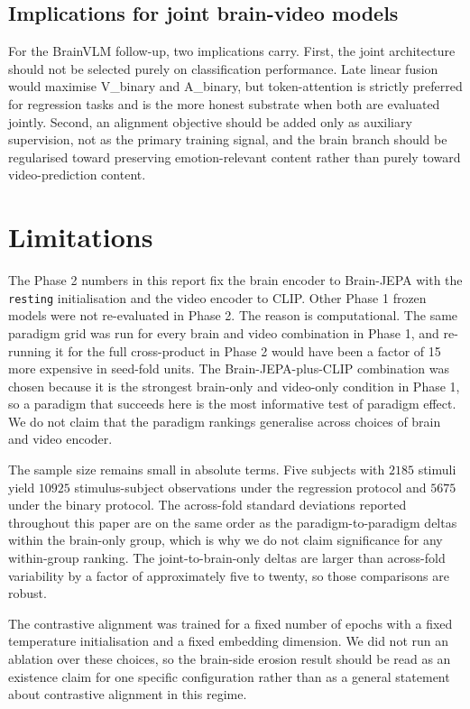 \documentclass[11pt, a4paper]{article}
\newcommand{\fefn}[1]{\texttt{\small #1}}
\begin{document}
\subsection{Implications for joint brain-video models}
For the BrainVLM follow-up, two implications carry. First, the joint architecture should
not be selected purely on classification performance. Late linear fusion would maximise
V\_binary and A\_binary, but token-attention is strictly preferred for regression tasks
and is the more honest substrate when both are evaluated jointly. Second, an alignment
objective should be added only as auxiliary supervision, not as the primary training
signal, and the brain branch should be regularised toward preserving emotion-relevant
content rather than purely toward video-prediction content.

\section{Limitations}
\label{sec:limits}

The Phase 2 numbers in this report fix the brain encoder to Brain-JEPA with the
\fefn{resting} initialisation and the video encoder to CLIP. Other Phase 1 frozen models
were not re-evaluated in Phase 2. The reason is computational. The same paradigm grid
was run for every brain and video combination in Phase 1, and re-running it for the full
cross-product in Phase 2 would have been a factor of 15 more expensive in seed-fold
units. The Brain-JEPA-plus-CLIP combination was chosen because it is the strongest
brain-only and video-only condition in Phase 1, so a paradigm that succeeds here is the
most informative test of paradigm effect. We do not claim that the paradigm rankings
generalise across choices of brain and video encoder.

The sample size remains small in absolute terms. Five subjects with $2185$ stimuli yield
$10925$ stimulus-subject observations under the regression protocol and $5675$ under the
binary protocol. The across-fold standard deviations reported throughout this paper are
on the same order as the paradigm-to-paradigm deltas within the brain-only group, which
is why we do not claim significance for any within-group ranking. The joint-to-brain-only
deltas are larger than across-fold variability by a factor of approximately five to
twenty, so those comparisons are robust.

The contrastive alignment was trained for a fixed number of epochs with a fixed
temperature initialisation and a fixed embedding dimension. We did not run an ablation
over these choices, so the brain-side erosion result should be read as an existence claim
for one specific configuration rather than as a general statement about contrastive
alignment in this regime.
\end{document}
